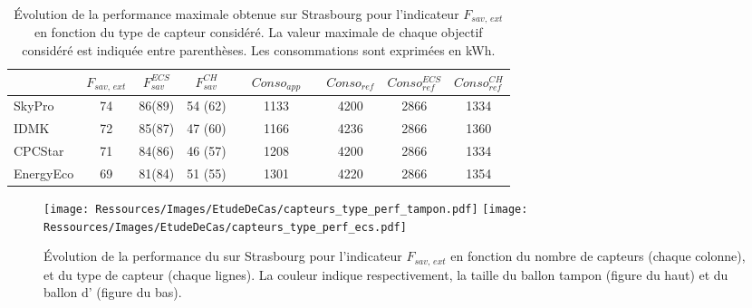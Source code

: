 \begin{table}
\centering
\caption[Performance maximale pouvant être obtenue pour les différents capteurs solaires sur Strasbourg]
         {Évolution de la performance maximale obtenue sur Strasbourg pour l’indicateur
          $F_{sav,\, ext}$ en fonction du type de capteur considéré. La valeur maximale
          de chaque objectif considéré est indiquée entre parenthèses. Les consommations
          sont exprimées en \si{kWh}.}
\label{tab:capteur_perf_variation}
\begin{tabular}{l c c c c c c c c c}
    \toprule
              & $F_{sav,\,ext}$ & $F_{sav}^{ECS}$ & $F_{sav}^{CH}$ & &  $Conso_{app}$ & & $Conso_{ref}$ & $Conso_{ref}^{ECS}$ & $Conso_{ref}^{CH}$ \\
    \midrule
    SkyPro    & \num{74} & \num{86}(\num{89}) & \num{54} (\num{62}) & & \num{1133} & & \num{4200} & \num{2866} & \num{1334} \\
    IDMK      & \num{72} & \num{85}(\num{87}) & \num{47} (\num{60}) & & \num{1166} & & \num{4236} & \num{2866} & \num{1360} \\
    CPCStar   & \num{71} & \num{84}(\num{86}) & \num{46} (\num{57}) & & \num{1208} & & \num{4200} & \num{2866} & \num{1334} \\
    EnergyEco & \num{69} & \num{81}(\num{84}) & \num{51} (\num{55}) & & \num{1301} & & \num{4220} & \num{2866} & \num{1354} \\
    \bottomrule
\end{tabular}
\end{table}


\begin{figure}
    \centering
    \texttt{[image: Ressources/Images/EtudeDeCas/capteurs\_type\_perf\_tampon.pdf]}
    \texttt{[image: Ressources/Images/EtudeDeCas/capteurs\_type\_perf\_ecs.pdf]}
    \caption[Évolution de la performance du  en fonction du type de capteurs sur Strasbourg]
             {Évolution de la performance du  sur Strasbourg pour l’indicateur $F_{sav,\,ext}$
              en fonction du nombre de capteurs (chaque colonne), et du type de capteur
              (chaque lignes). La couleur indique respectivement, la taille
              du ballon tampon (figure du haut) et du ballon d’ (figure du bas).}
    \label{fig:evolution_type_capteurs}
\end{figure}

